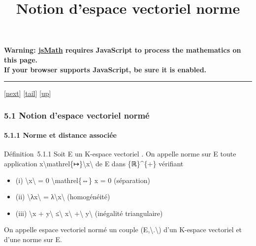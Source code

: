 \documentclass[]{article}
\title{Notion d'espace vectoriel norme}
\author{}
\date{}
\begin{document}
\maketitle

\textbf{Warning: \href{http://www.math.union.edu/locate/jsMath}{jsMath}
requires JavaScript to process the mathematics on this page.\\ If your
browser supports JavaScript, be sure it is enabled.}

\begin{center}\rule{3in}{0.4pt}\end{center}

{[}\href{coursse28.html}{next}{]}
{[}\hyperref[tailcoursse27.html]{tail}{]}
{[}\href{coursch6.html\#coursse27.html}{up}{]}

\subsubsection{5.1 Notion d'espace vectoriel normé}

\paragraph{5.1.1 Norme et distance associée}

Définition~5.1.1 Soit E un K-espace vectoriel . On appelle norme sur E
toute application
x\textbackslash{}mathrel\{↦\}\textbackslash{}\textbar{}x\textbackslash{}\textbar{}
de E dans \{ℝ\}\^{}\{+\} vérifiant

\begin{itemize}
\itemsep1pt\parskip0pt
\item
  (i) \textbackslash{}\textbar{}x\textbackslash{}\textbar{} = 0
  \textbackslash{}mathrel\{⇔\} x = 0 (séparation)
\item
  (ii) \textbackslash{}\textbar{}λx\textbackslash{}\textbar{} =
  \textbar{}λ\textbar{}\textbackslash{}\textbar{}x\textbackslash{}\textbar{}
  (homogénéité)
\item
  (iii) \textbackslash{}\textbar{}x + y\textbackslash{}\textbar{}
  ≤\textbackslash{}\textbar{} x\textbackslash{}\textbar{}
  +\textbackslash{}\textbar{} y\textbackslash{}\textbar{} (inégalité
  triangulaire)
\end{itemize}

On appelle espace vectoriel normé un couple
(E,\textbackslash{}\textbar{}.\textbackslash{}\textbar{}) d'un K-espace
vectoriel et d'une norme sur E.
\end{document}
